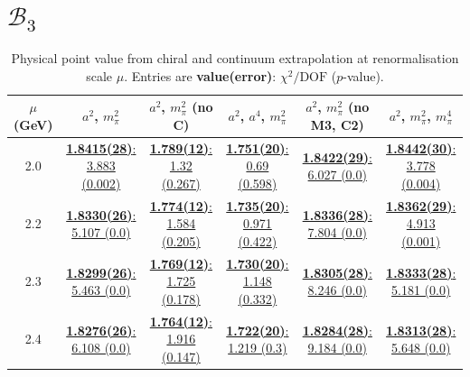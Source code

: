 \documentclass[12pt]{extarticle}
\begin{document}
\section{$\mathcal{B}_3$}
\begin{table}[h!]
\begin{center}
\begin{tabular}{|c|c|c|c|c|c|}
\hline
$\mu$ (GeV) & $a^2$, $m_\pi^2$& $a^2$, $m_\pi^2$ (no C)& $a^2$, $a^4$, $m_\pi^2$& $a^2$, $m_\pi^2$ (no M3, C2)& $a^2$, $m_\pi^2$, $m_\pi^4$\\
\hline
2.0& \hyperlink{SSmPP/NPR/a2m2_20.pdf.1}{\textbf{1.8415(28)}: 3.883 (0.002)} & \hyperlink{SSmPP/NPR/a2m2noC_20.pdf.1}{\textbf{1.789(12)}: 1.32 (0.267)} & \hyperlink{SSmPP/NPR/a2a4m2_20.pdf.1}{\textbf{1.751(20)}: 0.69 (0.598)} & \hyperlink{SSmPP/NPR/a2m2mcut_20.pdf.1}{\textbf{1.8422(29)}: 6.027 (0.0)} & \hyperlink{SSmPP/NPR/a2m2m4_20.pdf.1}{\textbf{1.8442(30)}: 3.778 (0.004)}\\
2.2& \hyperlink{SSmPP/NPR/a2m2_22.pdf.1}{\textbf{1.8330(26)}: 5.107 (0.0)} & \hyperlink{SSmPP/NPR/a2m2noC_22.pdf.1}{\textbf{1.774(12)}: 1.584 (0.205)} & \hyperlink{SSmPP/NPR/a2a4m2_22.pdf.1}{\textbf{1.735(20)}: 0.971 (0.422)} & \hyperlink{SSmPP/NPR/a2m2mcut_22.pdf.1}{\textbf{1.8336(28)}: 7.804 (0.0)} & \hyperlink{SSmPP/NPR/a2m2m4_22.pdf.1}{\textbf{1.8362(29)}: 4.913 (0.001)}\\
2.3& \hyperlink{SSmPP/NPR/a2m2_23.pdf.1}{\textbf{1.8299(26)}: 5.463 (0.0)} & \hyperlink{SSmPP/NPR/a2m2noC_23.pdf.1}{\textbf{1.769(12)}: 1.725 (0.178)} & \hyperlink{SSmPP/NPR/a2a4m2_23.pdf.1}{\textbf{1.730(20)}: 1.148 (0.332)} & \hyperlink{SSmPP/NPR/a2m2mcut_23.pdf.1}{\textbf{1.8305(28)}: 8.246 (0.0)} & \hyperlink{SSmPP/NPR/a2m2m4_23.pdf.1}{\textbf{1.8333(28)}: 5.181 (0.0)}\\
2.4& \hyperlink{SSmPP/NPR/a2m2_24.pdf.1}{\textbf{1.8276(26)}: 6.108 (0.0)} & \hyperlink{SSmPP/NPR/a2m2noC_24.pdf.1}{\textbf{1.764(12)}: 1.916 (0.147)} & \hyperlink{SSmPP/NPR/a2a4m2_24.pdf.1}{\textbf{1.722(20)}: 1.219 (0.3)} & \hyperlink{SSmPP/NPR/a2m2mcut_24.pdf.1}{\textbf{1.8284(28)}: 9.184 (0.0)} & \hyperlink{SSmPP/NPR/a2m2m4_24.pdf.1}{\textbf{1.8313(28)}: 5.648 (0.0)}\\
\hline
\end{tabular}
\caption{Physical point value from chiral and continuum extrapolation at renormalisation scale $\mu$. Entries are \textbf{value(error)}: $\chi^2/\text{DOF}$ ($p$-value).}
\end{center}
\end{table}
\end{document}
